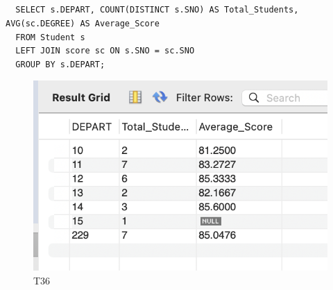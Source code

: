 \documentclass[UTF8]{ctexart}
\begin{document}
\subsection{}
\begin{lstlisting}
  SELECT s.DEPART, COUNT(DISTINCT s.SNO) AS Total_Students, AVG(sc.DEGREE) AS Average_Score
  FROM Student s
  LEFT JOIN score sc ON s.SNO = sc.SNO
  GROUP BY s.DEPART;  
\end{lstlisting}
\begin{figure}[H]
  \centering
  \includegraphics[scale=0.7]{pics/36.png}
  \caption*{T36}
\end{figure}
\end{document}
